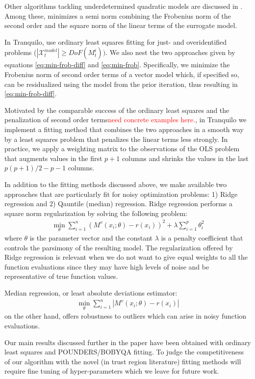 Other algorithms tackling underdetermined quadratic models are discussed in \cite{Larson2019}. Among these, \cite{Powell2012} minimizes a semi norm combining the Frobenius norm of the second order and the square norm of the linear terms of the surrogate model.

In Tranquilo, use ordinary least squares fitting for just- and overidentified problems ($|\mathcal{X}_t^{model}|\geq DoF(M_t^{i}))$. We also nest the two approaches given by equations \ref{eq:min-frob-diff} and \ref{eq:min-frob}. Specifically, we minimize the Frobenius norm of second order terms of a vector model which, if specified so, can be residualized using the model from the prior iteration, thus resulting in \ref{eq:min-frob-diff}.

Motivated by the comparable success of the ordinary least squares and the penalization of second order terms\textcolor{red}{need concrete examples here.}, in Tranquilo we implement a fitting method that combines the two approaches in a smooth way by a least squares problem that penalizes the linear terms less strongly. In practice, we apply a weighting matrix to the observations of the OLS problem that augments values in the first $p+1$ columns and shrinks the values in the last $p(p+1)/2-p-1$ columns.

In addition to the fitting methods discussed above, we make available two approaches that are particularly fit for noisy optimization problems: 1) Ridge regression and 2) Qauntile (median) regression. Ridge regression performs a square norm regularization by solving the following problem:
\begin{align}
    \min\limits_{\theta}\sum\limits_{i=1}^{n}(M^v(x_i;\theta)-r(x_i))^2+\lambda\sum\limits_{i=1}^{p}\theta_i^2
    \label{eq:fit-ridge}
\end{align}
where $\theta$ is the parameter vector and the constant $\lambda$ is a penalty coefficient that controls the parsimony of the resulting model. The regularization offered by Ridge regression is relevant when we do not want to give equal weights to all the function evaluations since they may have high levels of noise and be representative of true function values.

Median regression, or least absolute deviations estimator:
\begin{align}
    \min\limits_{\theta}\sum\limits_{i=1}^{n}|M^v(x_i;\theta)-r(x_i)|
    \label{eq:fit-lad}
\end{align}
on the other hand, offers robustness to outliers which can arise in noisy function evaluations.

Our main results discussed further in the paper have been obtained with ordinary least squares and POUNDERS/BOBYQA fitting. To judge the competitiveness of our algorithm with the novel (in trust region literature) fitting methods will require fine tuning of hyper-parameters which we leave for future work.
